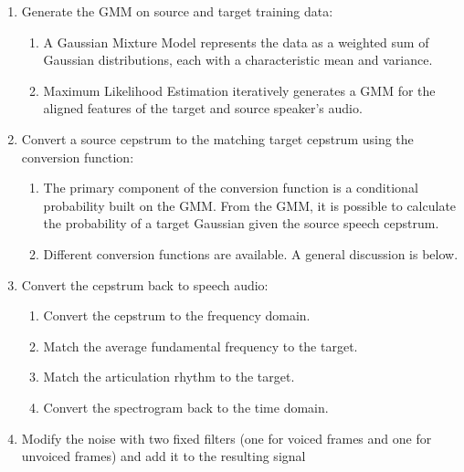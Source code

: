 \documentclass{article}
\begin{document}
\begin{enumerate}
\item Generate the GMM on source and target training data:
\begin{enumerate}
\item A Gaussian Mixture Model represents the data as a weighted sum of Gaussian distributions, each with a characteristic mean and variance.
\item Maximum Likelihood Estimation iteratively generates a GMM for the aligned features of the target and source speaker's audio.
\end{enumerate}

\item Convert a source cepstrum to the matching target cepstrum using the  conversion function:
\begin{enumerate}
\item The primary component of the conversion function is a conditional probability built on the GMM. From the GMM, it is possible to calculate the probability of a target Gaussian given the source speech cepstrum.
\item Different conversion functions are available. A general discussion is below.
\end{enumerate}

\item Convert the cepstrum back to speech audio:
\begin{enumerate}
\item Convert the cepstrum to the frequency domain.
\item Match the average fundamental frequency to the target.
\item Match the articulation rhythm to the target.
\item Convert the spectrogram back to the time domain.
\end{enumerate}

\item Modify the noise with two fixed filters (one for voiced frames and one for unvoiced frames) and add it to the resulting signal
\end{enumerate}
\end{document}
